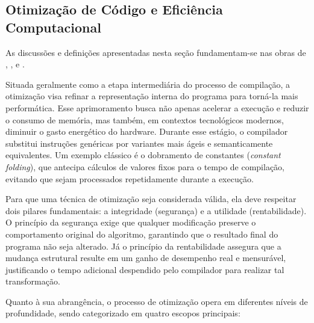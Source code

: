 \subsection{Otimização de Código e Eficiência Computacional}

As discussões e definições apresentadas nesta seção fundamentam-se nas obras de , ,  e .

Situada geralmente como a etapa intermediária do processo de compilação, a otimização visa refinar a representação interna do programa para torná-la mais performática. Esse aprimoramento busca não apenas acelerar a execução e reduzir o consumo de memória, mas também, em contextos tecnológicos modernos, diminuir o gasto energético do hardware. Durante esse estágio, o compilador substitui instruções genéricas por variantes mais ágeis e semanticamente equivalentes. Um exemplo clássico é o dobramento de constantes (\textit{constant folding}), que antecipa cálculos de valores fixos para o tempo de compilação, evitando que sejam processados repetidamente durante a execução.

Para que uma técnica de otimização seja considerada válida, ela deve respeitar dois pilares fundamentais: a integridade (segurança) e a utilidade (rentabilidade). O princípio da segurança exige que qualquer modificação preserve o comportamento original do algoritmo, garantindo que o resultado final do programa não seja alterado. Já o princípio da rentabilidade assegura que a mudança estrutural resulte em um ganho de desempenho real e mensurável, justificando o tempo adicional despendido pelo compilador para realizar tal transformação.

Quanto à sua abrangência, o processo de otimização opera em diferentes níveis de profundidade, sendo categorizado em quatro escopos principais:

